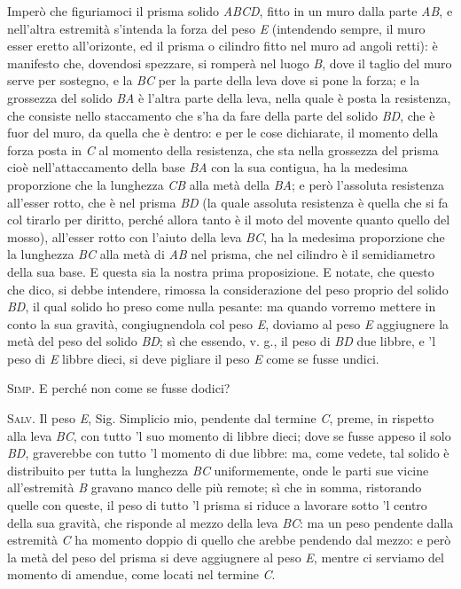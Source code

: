 \documentclass[11pt,twoside,openany]{book}
\newcommand{\speaker}[1]{\textcolor{rubric}{\textsc{#1}}\space}
\begin{document}
Imperò che figuriamoci il prisma solido \emph{ABCD}, fitto in un muro dalla parte \emph{AB}, e nell'altra estremità s'intenda la forza del peso \emph{E} (intendendo sempre, il muro esser eretto all'orizonte, ed il prisma o cilindro fitto nel muro ad angoli retti): è manifesto che, dovendosi spezzare, si romperà nel luogo \emph{B}, dove il taglio del muro serve per sostegno, e la \emph{BC} per la parte della leva dove si pone la forza; e la grossezza del solido \emph{BA} è l'altra parte della leva, nella quale è posta la resistenza, che consiste nello staccamento che s'ha da fare della parte del solido \emph{BD}, che è fuor del muro, da quella che è dentro: e per le cose dichiarate, il momento della forza posta in \emph{C} al momento della resistenza, che sta nella grossezza del prisma cioè nell'attaccamento della base \emph{BA} con la sua contigua, ha la medesima proporzione che la lunghezza \emph{CB} alla metà della \emph{BA}; e però l'assoluta resistenza all'esser rotto, che è nel prisma \emph{BD} (la quale assoluta resistenza è quella che si fa col tirarlo per diritto, perché allora tanto è il moto del movente quanto quello del mosso), all'esser rotto con l'aiuto della leva \emph{BC}, ha la medesima proporzione che la lunghezza \emph{BC} alla metà di \emph{AB} nel prisma, che nel cilindro è il semidiametro della sua base. E questa sia la nostra prima proposizione. E notate, che questo che dico, si debbe intendere, rimossa la considerazione del peso proprio del solido \emph{BD}, il qual solido ho preso come nulla pesante: ma quando vorremo mettere in conto la sua gravità, congiugnendola col peso \emph{E}, doviamo al peso \emph{E} aggiugnere la metà del peso del solido \emph{BD}; sì che essendo, v. g., il peso di \emph{BD} due libbre, e 'l peso di \emph{E} libbre dieci, si deve pigliare il peso \emph{E} come se fusse undici.

\speaker{Simp.} E perché non come se fusse dodici?

\speaker{Salv.} Il peso \emph{E}, Sig. Simplicio mio, pendente dal termine \emph{C}, preme, in rispetto alla leva \emph{BC}, con tutto 'l suo momento di libbre dieci; dove se fusse appeso il solo \emph{BD}, graverebbe con tutto 'l momento di due libbre: ma, come vedete, tal solido è distribuito per tutta la lunghezza \emph{BC} uniformemente, onde le parti sue vicine all'estremità \emph{B} gravano manco delle più remote; sì che in somma, ristorando quelle con queste, il peso di tutto 'l prisma si riduce a lavorare sotto 'l centro della sua gravità, che risponde al mezzo della leva \emph{BC}: ma un peso pendente dalla estremità \emph{C} ha momento doppio di quello che arebbe pendendo dal mezzo: e però la metà del peso del prisma si deve aggiugnere al peso \emph{E}, mentre ci serviamo del momento di amendue, come locati nel termine \emph{C}.
\end{document}
